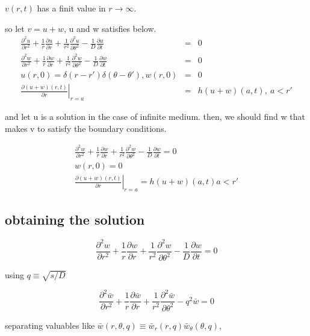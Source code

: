 \documentclass{article}
\begin{document}
$v(r,t)$ has a finit value in $r\rightarrow\infty$. 

so let $v = u+w$, u and w satisfies below.
\begin{eqnarray}
    \frac{\partial^2 u}{\partial r^2}+\frac{1}{r}\frac{\partial u}{\partial r}+\frac{1}{r^2}\frac{\partial^2 u}{\partial\theta^2}-\frac{1}{D}\frac{\partial u}{\partial t}&=&0 \\
    \frac{\partial^2 w}{\partial r^2}+\frac{1}{r}\frac{\partial w}{\partial r}+\frac{1}{r^2}\frac{\partial^2 w}{\partial\theta^2}-\frac{1}{D}\frac{\partial w}{\partial t}&=&0 \\
    u(r,0)=\delta(r-r')\delta(\theta-\theta'), w(r,0)&=&0 \\
    \left.\frac{\partial (u+w)(r,t)}{\partial r}\right|_{r=a}&=&h(u+w)(a,t),\ a<r'
\end{eqnarray}

and let u is a solution in the case of infinite medium. then, we should find w that makes v to satisfy the boundary conditions.

\begin{eqnarray}
    \frac{\partial^2 w}{\partial r^2}+\frac{1}{r}\frac{\partial w}{\partial r}+\frac{1}{r^2}\frac{\partial^2 w}{\partial\theta^2}-\frac{1}{D}\frac{\partial w}{\partial t}=0 \\
    w(r,0)=0\\
    \left.\frac{\partial (u+w)(r,t)}{\partial r}\right|_{r=a}=h(u+w)(a,t) a<r'
\end{eqnarray}

\subsection{obtaining the solution}

\begin{equation}
    \frac{\partial^2 w}{\partial r^2}+\frac{1}{r}\frac{\partial w}{\partial r}+\frac{1}{r^2}\frac{\partial^2 w}{\partial\theta^2}-\frac{1}{D}\frac{\partial w}{\partial t}=0
\end{equation}

using $q\equiv\sqrt{s/D}$

\begin{equation}
    \frac{\partial^2\bar{w}}{\partial r^2}+\frac{1}{r}\frac{\partial\bar{w}}{\partial r}+\frac{1}{r^2}\frac{\partial^2\bar{w}}{\partial\theta^2}-q^2\bar{w}=0
\end{equation}

separating valuables like 
$\bar{w}(r,\theta,q)\equiv\bar{w}_r(r,q)\bar{w}_\theta(\theta,q)$, 
\end{document}
